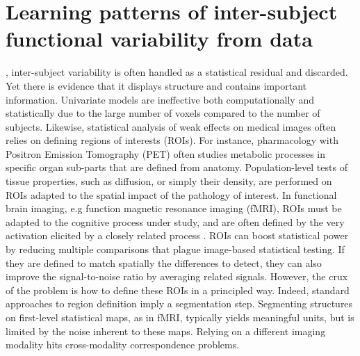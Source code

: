 \chapter{Learning patterns of inter-subject functional variability from data}\label{chap:func_var}

\minitoc

, inter-subject variability is often handled as a statistical residual and discarded. Yet there is evidence that it displays structure and contains important information. Univariate models are ineffective both computationally and statistically due to the large number of voxels compared to the number of subjects. Likewise,
statistical analysis of weak effects on medical images often relies on
defining regions of interests (ROIs). For instance, pharmacology
with Positron Emission Tomography (PET) often studies metabolic
processes in specific organ sub-parts that are defined from anatomy.
Population-level tests of tissue properties, such as diffusion, or
simply their density, are performed on ROIs adapted to the spatial
impact of the pathology of interest. In functional brain imaging,
e.g function magnetic resonance imaging (fMRI), ROIs must be
adapted to the cognitive process under study, and are often defined by
the very activation elicited by a closely related process  \citep{saxe2006}.
ROIs can boost statistical power by reducing multiple comparisons that
plague image-based statistical testing. If they are defined to match
spatially the differences to detect, they can also improve
the signal-to-noise ratio by averaging related signals. 
%
However, the crux of
the problem is how to define these ROIs in a principled way. 
%
Indeed, standard approaches to region definition imply a
segmentation step. 
Segmenting structures on first-level statistical maps, as in fMRI,
typically yields meaningful units, but is limited by the noise
inherent to these maps.
Relying on a different imaging modality
hits cross-modality correspondence problems.



